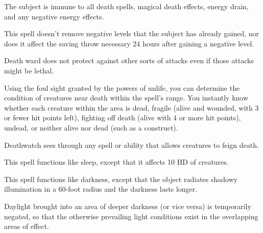 \begin{multicols}{2}
\begin{small}
\noindent The subject is immune to all death spells, magical death effects, energy drain, and any negative energy effects.

\smallskip\noindent This spell doesn't remove negative levels that the subject has already gained, nor does it affect the saving throw necessary 24 hours after gaining a negative level.

\smallskip\noindent Death ward does not protect against other sorts of attacks even if those attacks might be lethal.

\noindent Using the foul sight granted by the powers of unlife, you can determine the condition of creatures near death within the spell's range. You instantly know whether each creature within the area is dead, fragile (alive and wounded, with 3 or fewer hit points left), fighting off death (alive with 4 or more hit points), undead, or neither alive nor dead (such as a construct).

\smallskip\noindent Deathwatch sees through any spell or ability that allows creatures to feign death.

\noindent This spell functions like sleep, except that it affects 10 HD of creatures.

\noindent This spell functions like darkness, except that the object radiates shadowy illumination in a 60-foot radius and the darkness lasts longer.

\smallskip\noindent Daylight brought into an area of deeper darkness (or vice versa) is temporarily negated, so that the otherwise prevailing light conditions exist in the overlapping areas of effect.


\end{small}
\end{multicols}
